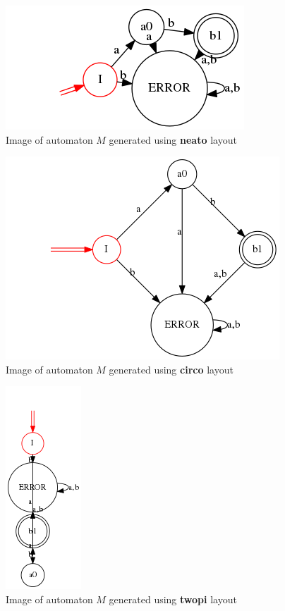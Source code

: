 \documentclass{ctuthesis}
\begin{document}
\begin{figure}[H]
\includegraphics[width=0.7\linewidth]{figures/layouts_neato.png}
\caption{Image of automaton $M$ generated using \textbf{neato} layout}
\label{fig:layout_diff_neato}
\end{figure}

\begin{figure}[H]
\includegraphics[width=0.7\linewidth]{figures/layouts_circo.png}
\caption{Image of automaton $M$ generated using \textbf{circo} layout}
\label{fig:layout_diff_circo}
\end{figure}

\begin{figure}[H]
\includegraphics[width=0.2\linewidth]{figures/layouts_twopi.png}
\caption{Image of automaton $M$ generated using \textbf{twopi} layout}
\label{fig:layout_diff_twopi}
\end{figure}
\end{document}
